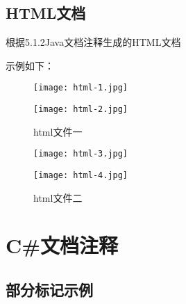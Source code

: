 \subsection{HTML文档}

根据5.1.2Java文档注释生成的HTML文档

示例如下：

\begin{figure}[htpd] 
 \centering 
 \begin{minipage}[t]{0.5\textwidth} 
   \centering 
   \texttt{[image: html-1.jpg]} 
 \end{minipage}%
 \begin{minipage}[t]{0.5\textwidth} 
   \centering 
   \texttt{[image: html-2.jpg]} 
 \end{minipage}%
 \caption{ html文件一}
\end{figure}

\begin{figure}[htpd]
  \centering 
  \begin{minipage}[t]{0.5\textwidth} 
    \centering 
    \texttt{[image: html-3.jpg]} 
  \end{minipage}%
  \begin{minipage}[t]{0.5\textwidth} 
    \centering 
    \texttt{[image: html-4.jpg]} 
  \end{minipage}%
  \caption{ html文件二}
\end{figure}

\newpage
\section{C\#文档注释}

\subsection{部分标记示例}

